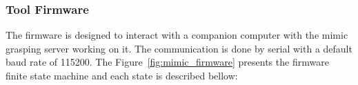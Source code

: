 \begin{figure}[h!]
\end{figure}

\subsubsection{Tool Firmware}
\label{cap4:modular_grasping_architecture:sec:grasping_synthesis:subsec:mimic_grasping:subsubsec:firmware}

The firmware is designed to interact with a companion computer with the mimic grasping server working on it. The communication is done by serial with a default baud rate of 115200. The Figure~\ref{fig:mimic_firmware} presents the firmware finite state machine and each state is described bellow:

